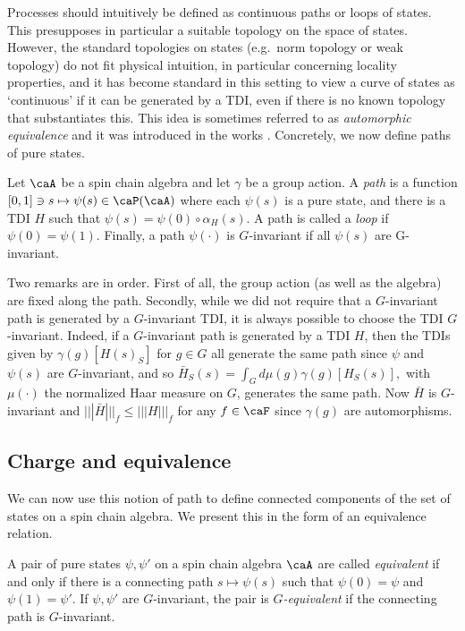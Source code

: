 Processes should intuitively be defined as continuous paths or loops of states.  This  presupposes in particular a suitable topology on the space of states. However, the standard topologies on states (e.g.\ norm topology or weak topology) do not fit physical intuition, in particular concerning locality properties, and it has become standard in this setting to view a curve of states as `continuous' if it can be generated by a TDI, even if there is no known topology that substantiates this.  This idea is sometimes referred to as \emph{automorphic equivalence} and it was introduced in the works \cite{hastings2005quasiadiabatic,bachmann2012automorphic}.  Concretely, we now define paths of pure states.
\begin{definition}[Paths] \label{def: paths}
	Let $\caA$ be a spin chain algebra and let $\gamma$ be a group action. A \emph{path} is a function $[0,1] \ni s \mapsto \psi(s)\in\caP(\caA)$ where each $\psi(s)$ is a pure state, and there is a TDI $H$ such that $\psi(s)=\psi(0)\circ\alpha_H(s)$. A path is called a \emph{loop} if $\psi(0) = \psi(1)$.
	Finally, a path $\psi(\cdot)$ is $G$-invariant if all $\psi(s)$ are G-invariant. 
\end{definition}
Two remarks are in order. First of all, the group action (as well as the algebra) are fixed along the path. Secondly, while we did not require that a $G$-invariant path is generated by a $G$-invariant TDI, it is always possible to choose the TDI $G$-invariant. Indeed, if a $G$-invariant path is generated by a TDI $H$, then the TDIs given by $\gamma(g)[H(s)_S]$ for $g\in G$ all generate the same path since $\psi$ and $\psi(s)$ are $G$-invariant, and so
$
\bar{H}_S(s)=   \int_G d\mu(g)  \gamma(g)[H_S(s)],
$
with $\mu(\cdot)$ the normalized Haar measure on $G$, generates the same path. Now $\bar{H}$ is $G$-invariant and $|||\bar H |||_f \leq |||H|||_f$ for any $f\in \caF$ since $\gamma(g)$ are automorphisms.


\subsection{Charge and equivalence}\label{sec: equivalence}

We can now use this notion of path to define connected components of the set of states on a spin chain algebra. We present this in the form of an equivalence relation.
\begin{definition}[Equivalence]
	A pair of pure states $\psi,\psi'$  on a spin chain algebra $\caA$ are called \emph{equivalent} if and only if there is a connecting  path $s\mapsto \psi(s)$ such that $\psi(0)=\psi$ and $\psi(1)=\psi'$. If $\psi,\psi'$ are $G$-invariant, the pair is \emph{$G$-equivalent} if the connecting path is $G$-invariant. 
\end{definition}

